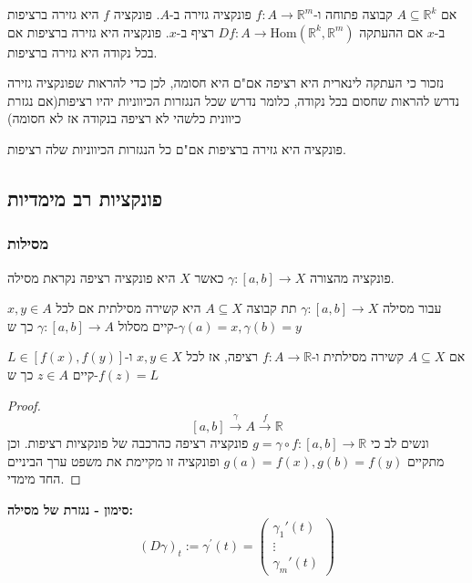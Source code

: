 \documentclass{tstextbook}
\begin{document}
\begin{definition}
אם \(A\subseteq \mathbb{R}^k\) קבוצה פתוחה ו-\(f:A\to\mathbb{R}^m\) פונקציה גזירה ב-\(A\). פונקציה \(f\) היא גזירה ברציפות ב-\(x\) אם ההעתקה \(Df:A\to \mathrm{Hom}\left( \mathbb{R}^k,\mathbb{R}^m \right)\) רציף ב-\(x\). פונקציה היא גזירה ברציפות אם בכל נקודה היא גזירה ברציפות.

\end{definition}
נזכור כי העתקה לינארית היא רציפה אם"ם היא חסומה, לכן כדי להראות שפונקציה גזירה נדרש להראות שחסום בכל נקודה, כלומר נדרש שכל הנגזרות הכיווניות יהיו רציפות(אם נגזרת כיוונית כלשהי לא רציפה בנקודה אז לא חסומה)

\begin{corollary}
פונקציה היא גזירה ברציפות אם"ם כל הנגזרות הכיווניות שלה רציפות.

\end{corollary}
\subsection{פונקציות רב מימדיות}

\subsubsection{מסילות}

\begin{definition}[מסילה]
פונקציה מהצורה \(\gamma:[a,b]\to X\) כאשר \(X\) היא פונקציה רציפה נקראת מסילה.

\end{definition}
\begin{definition}
עבור מסילה \(\gamma:[a,b]\to X\) תת קבוצה \(A\subseteq X\) היא קשירה מסילתית אם לכל \(x,y\in A\) קיים מסלול \(\gamma:[a,b]\to A\) כך ש-\(\gamma(a)=x,\gamma(b)=y\)

\end{definition}
\begin{theorem}
אם \(A\subseteq X\) קשירה מסילתית ו-\(f:A\to\mathbb{R}\) רציפה, אז לכל \(x,y\in X\) ו-\(L\in[f(x),f(y)]\) קיים \(z\in A\) כך ש-\(f(z)=L\)

\end{theorem}
\begin{proof}
$$[a,b]\xrightarrow{\gamma}A\xrightarrow{f}\mathbb{R}$$
ונשים לב כי \(g=\gamma \circ f:[a,b]\to\mathbb{R}\) פונקציה רציפה כהרכבה של פונקציות רציפות. וכן מתקיים \(g(a)=f(x),g(b)=f(y)\) ופונקציה זו מקיימת את משפט ערך הביניים החד מימדי.

\end{proof}
\textbf{סימון - נגזרת של מסילה:}$$\left( D\gamma \right)_{t}:=\gamma^{\prime}(t)=\begin{pmatrix}\gamma_{1}'(t) \\\vdots \\\gamma_{m}'(t)
\end{pmatrix}$$
\end{document}
